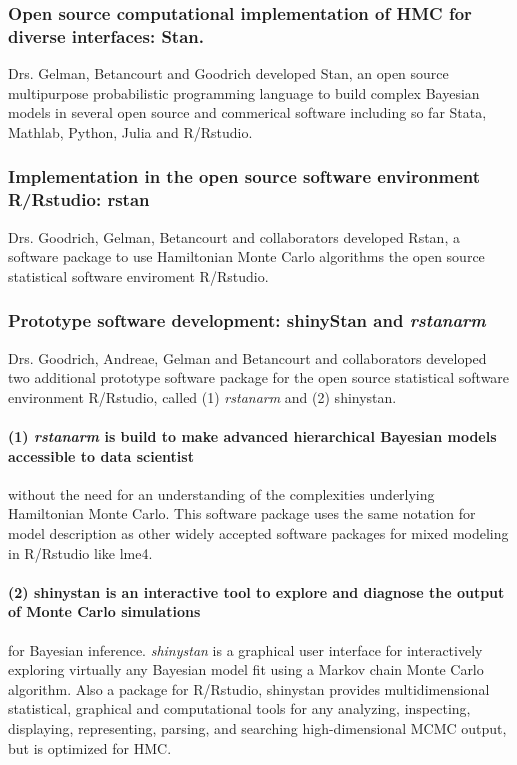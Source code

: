 \documentclass[11pt,notitlepage]{article}
\begin{document}
\subsubsection*{Open source computational implementation of HMC for diverse interfaces: Stan.} Drs. Gelman, Betancourt and Goodrich developed Stan, an open source multipurpose probabilistic programming language to build complex Bayesian models in several open source and commerical software including so far Stata, Mathlab, Python, Julia and R/Rstudio. 
 
\subsubsection*{Implementation in the open source software environment R/Rstudio: rstan} Drs. Goodrich, Gelman, Betancourt and collaborators developed Rstan, a software package to use Hamiltonian Monte Carlo algorithms the open source statistical software enviroment R/Rstudio.
\subsubsection*{Prototype software development: shinyStan and \textit{rstanarm}} Drs. Goodrich, Andreae, Gelman and Betancourt and collaborators developed two additional prototype software package for the open source statistical software environment R/Rstudio, called (1) \textit{rstanarm} and (2) shinystan.

\paragraph*{(1) \textit{rstanarm} is build to make advanced hierarchical Bayesian models accessible to data scientist} without the need for an understanding of the complexities underlying Hamiltonian Monte Carlo. This software package uses the same notation for model description as other widely accepted software packages for mixed modeling in R/Rstudio like lme4. 
\paragraph*{(2) shinystan is an interactive tool to explore and diagnose the output of Monte Carlo simulations}for Bayesian inference.  \textit{shinystan} is a graphical user interface for interactively exploring virtually any Bayesian model fit using a Markov chain Monte Carlo algorithm. Also a package for R/Rstudio, shinystan  provides multidimensional statistical, graphical and computational tools for any analyzing, inspecting, displaying, representing, parsing, and searching high-dimensional MCMC output, but is optimized for HMC. 
\end{document}
